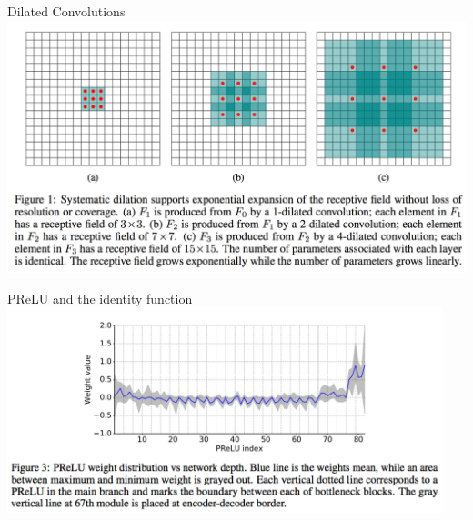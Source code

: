 \documentclass[]{beamer}
\begin{document}

\begin{frame}{Dilated Convolutions}
\centering
\includegraphics[scale=0.325]{figures/dilated-convolutions}
\end{frame}

\begin{frame}{PReLU and the identity function}
\centering
\includegraphics[width=0.95\textwidth]{figures/enet-prelu}
\end{frame}

\end{document}
